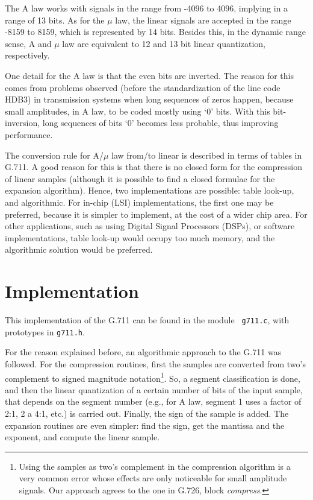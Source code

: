 The A law works with signals in the range from -4096 to 4096,
implying in a range of 13 bits. As for the $\mu$ law, the linear
signals are accepted in the range -8159 to 8159, which is represented
by 14 bits. Besides this, in the dynamic range sense, A and $\mu$ law
are equivalent to 12 and 13 bit linear quantization, respectively.

One detail for the A law is that the even bits are inverted. The reason
for this comes from problems observed (before the standardization of
the line code HDB3) in transmission systems when long sequences of
zeros happen, because small amplitudes, in A law, to be coded mostly
using `0' bits. With this bit-inversion, long sequences of bits `0'
becomes less probable, thus improving performance.

The conversion rule for A/$\mu$ law from/to linear is described in
terms of tables in G.711. A good reason for this is that there is no
closed form for the compression of linear samples (although it is
possible to find a closed formulae for the expansion algorithm). 
Hence, two implementations are possible: table look-up, and algorithmic.
For in-chip (LSI) implementations, the first one may be preferred,
because it is simpler to implement, at the cost of a wider chip area.
For other applications, such as using Digital Signal Processors (DSPs),
or software implementations, table look-up would occupy too much
memory, and the algorithmic solution would be preferred.

\section{Implementation}

This implementation of the G.711 can be found in the module {\tt
g711.c}, with prototypes in {\tt g711.h}.

For the reason explained before, an algorithmic approach to the G.711
was followed. For the compression routines, first the samples are
converted from two's complement to signed magnitude
notation\footnote{\SF Using the samples as two's complement in the
compression algorithm is a very common error whose effects are only
noticeable for small amplitude signals. Our approach agrees to the one
in G.726\cite{G.726}, block {\em compress}.}. So, a segment
classification is done, and then the linear quantization of a certain
number of bits of the input sample, that depends on the segment number
(e.g., for A law, segment 1 uses a factor of 2:1, 2 a 4:1, etc.) is
carried out. Finally, the sign of the sample is added. The expansion
routines are even simpler: find the sign, get the mantissa and the
exponent, and compute the linear sample.

